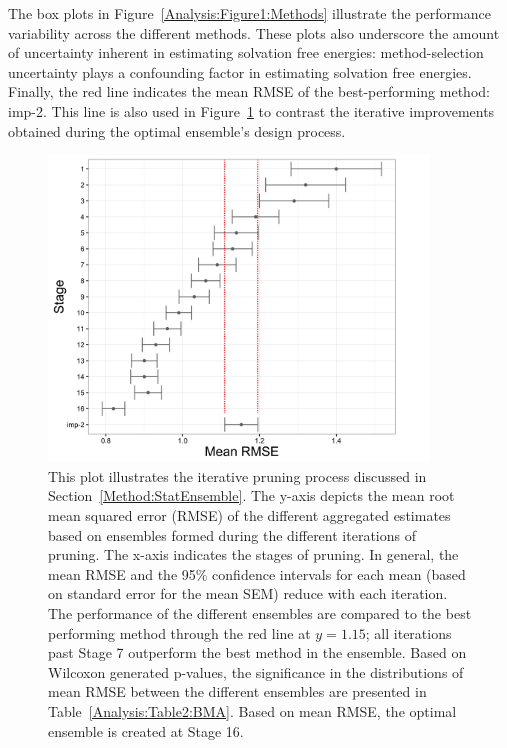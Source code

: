 \documentclass[journal=jpcbfk, manuscript=article]{achemso}
\newcommand{\+}[1]{\ensuremath{\mathbf{#1}}}
\begin{document}
The box plots in Figure~\ref{Analysis:Figure1:Methods} illustrate the performance variability across the different methods.
These plots also underscore the amount of uncertainty inherent in estimating solvation free energies: method-selection uncertainty plays a confounding factor in estimating solvation free energies.
Finally, the red line indicates the mean RMSE of the best-performing method: imp-2.
This line is also used in Figure~\ref{Analysis:Figure2:BMA} to contrast the iterative improvements obtained during the optimal ensemble's design process.
\begin{figure}[h!]
	\centering
	\includegraphics[keepaspectratio,width=0.9\textwidth]{Figures/Rev2/Exploratory_RMSE}
	\caption{This plot illustrates the iterative pruning process discussed in Section~\ref{Method:StatEnsemble}. The y-axis depicts the mean root mean squared error (RMSE) of the different aggregated estimates based on ensembles formed during the different iterations of pruning. The x-axis indicates the stages of pruning. In general, the mean RMSE and the 95\% confidence intervals for each mean (based on standard error for the mean SEM) reduce with each iteration. The performance of the different ensembles are compared to the best performing method through the red line at $y=1.15$; all iterations past Stage 7 outperform the best method in the ensemble. Based on Wilcoxon generated p-values, the significance in the distributions of mean RMSE between the different ensembles are presented in Table~\ref{Analysis:Table2:BMA}. Based on mean RMSE, the optimal ensemble is created at Stage 16.}
	\label{Analysis:Figure2:BMA}
\end{figure}
\end{document}

